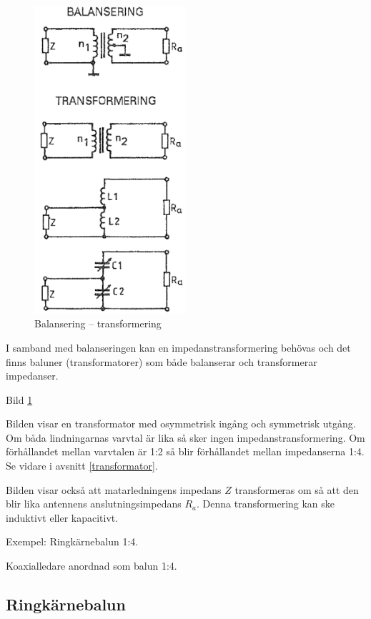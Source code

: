 \begin{figure}
  \includegraphics[width=0.5\textwidth]{images/cropped_pdfs/bild_2_6-28.pdf}
  \caption{Balansering -- transformering}
  \label{fig:bildII6-28}
\end{figure}

I samband med balanseringen kan en impedanstransformering behövas och
det finns baluner (transformatorer) som både balanserar och
transformerar impedanser.

Bild \ref{fig:bildII6-28}

Bilden visar en transformator med osymmetrisk ingång och symmetrisk
utgång. Om båda lindningarnas varvtal är lika så sker ingen
impedanstransformering. Om förhållandet mellan varvtalen är 1:2 så
blir förhållandet mellan impedanserna 1:4. Se vidare i avsnitt \ref{transformator}.

Bilden visar också att matarledningens impedans \(Z\) transformeras om så
att den blir lika antennens anslutningsimpedans \(R_a\).  Denna
transformering kan ske induktivt eller kapacitivt.

Exempel:
Ringkärnebalun 1:4.

Koaxialledare anordnad som balun 1:4.

\subsection{Ringkärnebalun}

